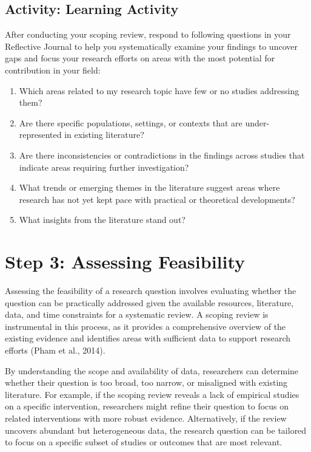 \documentclass[
  letterpaper,
  DIV=11,
  numbers=noendperiod]{scrreprt}
\providecommand{\tightlist}{%
  \setlength{\itemsep}{0pt}\setlength{\parskip}{0pt}}\usepackage{longtable,booktabs,array}
\begin{document}
\subsection*{Activity: Learning
Activity}\label{activity-learning-activity-9}

After conducting your scoping review, respond to following questions in
your Reflective Journal to help you systematically examine your findings
to uncover gaps and focus your research efforts on areas with the most
potential for contribution in your field:

\begin{enumerate}
\def\labelenumi{\arabic{enumi}.}
\tightlist
\item
  Which areas related to my research topic have few or no studies
  addressing them?
\item
  Are there specific populations, settings, or contexts that are
  under-represented in existing literature?
\item
  Are there inconsistencies or contradictions in the findings across
  studies that indicate areas requiring further investigation?
\item
  What trends or emerging themes in the literature suggest areas where
  research has not yet kept pace with practical or theoretical
  developments?
\item
  What insights from the literature stand out?
\end{enumerate}

\section*{Step 3: Assessing
Feasibility}\label{step-3-assessing-feasibility}


Assessing the feasibility of a research question involves evaluating
whether the question can be practically addressed given the available
resources, literature, data, and time constraints for a systematic
review. A scoping review is instrumental in this process, as it provides
a comprehensive overview of the existing evidence and identifies areas
with sufficient data to support research efforts (Pham et al., 2014).

By understanding the scope and availability of data, researchers can
determine whether their question is too broad, too narrow, or misaligned
with existing literature. For example, if the scoping review reveals a
lack of empirical studies on a specific intervention, researchers might
refine their question to focus on related interventions with more robust
evidence. Alternatively, if the review uncovers abundant but
heterogeneous data, the research question can be tailored to focus on a
specific subset of studies or outcomes that are most relevant.
\end{document}
